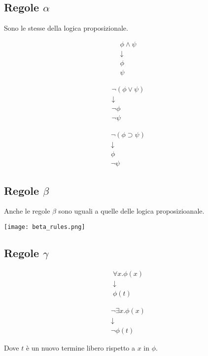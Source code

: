 \documentclass[../main.tex]{subfiles}
\begin{document}
  \subsection{Regole $\alpha$}
  Sono le stesse della logica proposizionale.\\
  \begin{minipage}{0.333333\textwidth}
   \begin{gather*}
       \phi \land \psi\\
       \downarrow\\
       \phi\\
       \psi
   \end{gather*}
   \end{minipage}
   \begin{minipage}{0.333333\textwidth}
      \begin{gather*}
         \lnot (\phi \lor \psi)\\
         \downarrow\\
         \lnot \phi\\
         \lnot \psi
      \end{gather*}
   \end{minipage}
   \begin{minipage}{0.333333\textwidth}
      \begin{gather*}
         \lnot (\phi \supset \psi)\\
         \downarrow\\
         \phi\\
         \lnot \psi
      \end{gather*}
   \end{minipage}
   \subsection{Regole $\beta$}
   Anche le regole $\beta$ sono uguali a quelle delle logica proposizioanale.
   \begin{center}
      \texttt{[image: beta\_rules.png]}
   \end{center}
   \subsection{Regole $\gamma$}
   \begin{minipage}{0.5\textwidth}
      \begin{gather*}
         \forall x. \phi (x)\\
         \downarrow\\
         \phi (t)
      \end{gather*}
   \end{minipage}
   \begin{minipage}{0.5\textwidth}
      \begin{gather*}
         \lnot \exists x. \phi (x)\\
         \downarrow\\
         \lnot \phi (t)
      \end{gather*}
   \end{minipage}
   Dove $t$ è un nuovo termine libero rispetto a $x$ in $\phi$.
\end{document}

